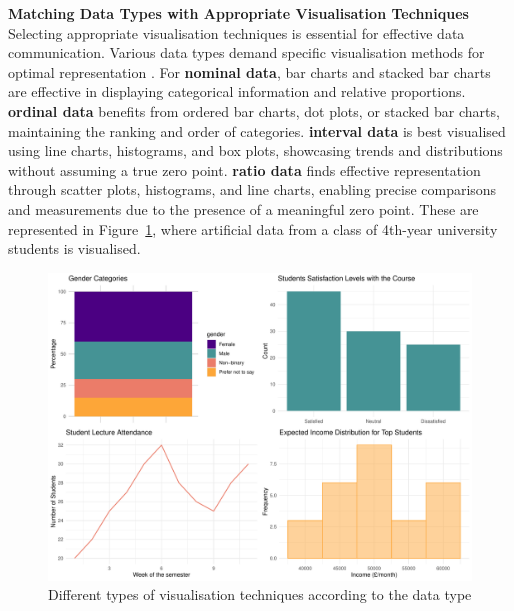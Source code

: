 \documentclass{article}\usepackage[]{graphicx}\usepackage[]{xcolor}
\makeatletter
\def\maxwidth{ %
  \ifdim\Gin@nat@width>\linewidth
    \linewidth
  \else
    \Gin@nat@width
  \fi
}
\newenvironment{knitrout}{}{} %
\numberwithin{equation}{section}
\makeatother
\begin{document}
\noindent \textbf{Matching Data Types with Appropriate Visualisation Techniques}\\
\noindent Selecting appropriate visualisation techniques is essential for effective data communication. Various data types demand specific visualisation methods for optimal representation \cite{healy2018data}. For \textbf{nominal data}, bar charts and stacked bar charts are effective in displaying categorical information and relative proportions. \textbf{ordinal data} benefits from ordered bar charts, dot plots, or stacked bar charts, maintaining the ranking and order of categories. \textbf{interval data} is best visualised using line charts, histograms, and box plots, showcasing trends and distributions without assuming a true zero point. \textbf{ratio data} finds effective representation through scatter plots, histograms, and line charts, enabling precise comparisons and measurements due to the presence of a meaningful zero point. These are represented in Figure~\ref{fig:data-plots}, where artificial data from a class of 4th-year university students is visualised.

\begin{knitrout}\scriptsize
{}\color{fgcolor}\begin{figure}[H]

{\centering \includegraphics[width=\maxwidth]{figure/beamer-data-plots-1} 

}

\caption[Different types of visualisation techniques according to the data type]{Different types of visualisation techniques according to the data type}\label{fig:data-plots}
\end{figure}

\end{knitrout}
\end{document}
